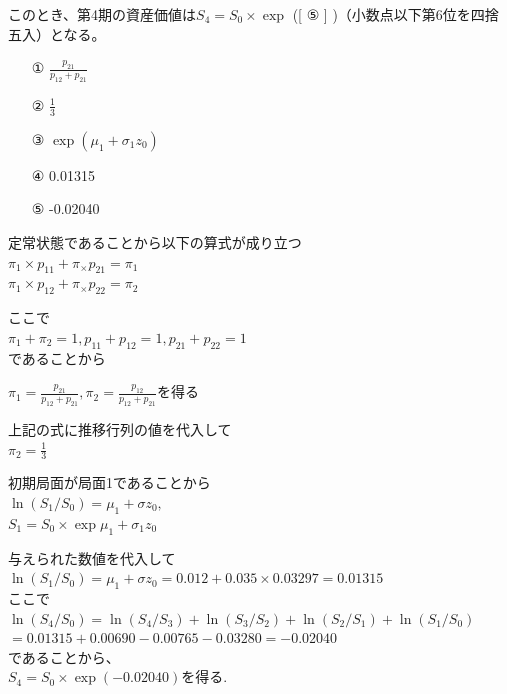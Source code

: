 \documentclass[report,gutter=10mm,fore-edge=10mm,uplatex,dvipdfmx]{jlreq}
\begin{document}
{このとき、第4期の資産価値は$S_4=S_0\times\exp$ ([ ⑤ ] )（小数点以下第6位を四捨五入）となる。

\answer{}
\begin{itemize}
 \item [①] $\frac{p_{21}}{p_{12}+p_{21}}$
 \item [②] $\frac{1}{3}$
 \item [③] $\exp{(\mu_1+\sigma_1z_0)}$
 \item [④] 0.01315
 \item [⑤] -0.02040
\end{itemize}

定常状態であることから以下の算式が成り立つ\\
$\pi_1\times p_{11}+ \pi_\times p_{21}=\pi_1$\\
$\pi_1\times p_{12}+ \pi_\times p_{22}=\pi_2$

ここで\\
$\pi_1+\pi_2=1, p_{11}+p_{12}=1, p_{21}+p_{22}=1$\\
であることから

$\pi_1=\frac{p_{21}}{p_{12}+p_{21}}, \pi_2=\frac{p_{12}}{p_{12}+p_{21}}$を得る

上記の式に推移行列の値を代入して\\
$\pi_2=\frac{1}{3}$

初期局面が局面1であることから\\
$\ln(S_1/S_0)=\mu_1+\sigma z_0,$\\
$S_1=S_0\times\exp{\mu_1+\sigma_1 z_0}$

与えられた数値を代入して
$\ln(S_1/S_0)=\mu_1+\sigma z_0=0.012+0.035\times 0.03297=0.01315$\\

ここで
$\ln(S_4/S_0)=\ln(S_4/S_3)+\ln(S_3/S_2)+\ln(S_2/S_1)+\ln(S_1/S_0)$\\
$=0.01315+0.00690-0.00765-0.03280=-0.02040$\\
であることから、\\
$S_4=S_0\times\exp(-0.02040)$を得る.

}
\end{document}
